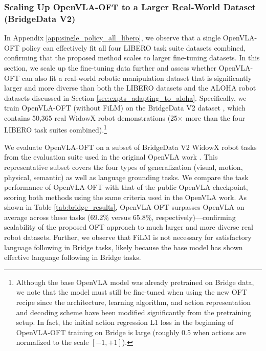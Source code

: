 \documentclass[conference]{IEEEtran}
\begin{document}
\subsubsection{Scaling Up OpenVLA-OFT to a Larger Real-World Dataset (BridgeData V2)}

In Appendix \ref{app:single_policy_all_libero}, we observe that a single OpenVLA-OFT policy can effectively fit all four LIBERO task suite datasets combined, confirming that the proposed method scales to larger fine-tuning datasets. In this section, we scale up the fine-tuning data further and assess whether OpenVLA-OFT can also fit a real-world robotic manipulation dataset that is significantly larger and more diverse than both the LIBERO datasets and the ALOHA robot datasets discussed in Section \ref{sec:expts_adapting_to_aloha}. Specifically, we train OpenVLA-OFT (without FiLM) on the BridgeData V2 dataset \citep{walke2023bridgedata}, which contains 50,365 real WidowX robot demonstrations (25$\times$ more than the four LIBERO task suites combined).\footnote{Although the base OpenVLA model was already pretrained on Bridge data, we note that the model must still be fine-tuned when using the new OFT recipe since the architecture, learning algorithm, and action representation and decoding scheme have been modified significantly from the pretraining setup. In fact, the initial action regression L1 loss in the beginning of OpenVLA-OFT training on Bridge is large (roughly 0.5 when actions are normalized to the scale $[-1,+1]$).}

We evaluate OpenVLA-OFT on a subset of BridgeData V2 WidowX robot tasks from the evaluation suite used in the original OpenVLA work \citep{kim2024openvla}. This representative subset covers the four types of generalization (visual, motion, physical, semantic) as well as language grounding tasks. We compare the task performance of OpenVLA-OFT with that of the public OpenVLA checkpoint, scoring both methods using the same criteria used in the OpenVLA work. As shown in Table \ref{tab:bridge_results}, OpenVLA-OFT surpasses OpenVLA on average across these tasks (69.2\% versus 65.8\%, respectively)---confirming scalability of the proposed OFT approach to much larger and more diverse real robot datasets. Further, we observe that FiLM is not necessary for satisfactory language following in Bridge tasks, likely because the base model has shown effective language following in Bridge tasks.
\end{document}
